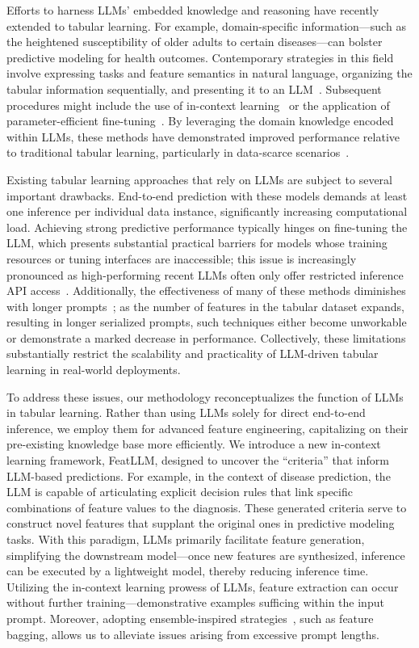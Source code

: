 Efforts to harness LLMs' embedded knowledge and reasoning have recently extended to tabular learning. For example, domain-specific information—such as the heightened susceptibility of older adults to certain diseases—can bolster predictive modeling for health outcomes. Contemporary strategies in this field involve expressing tasks and feature semantics in natural language, organizing the tabular information sequentially, and presenting it to an LLM~\cite{dinh2022lift,wang2023anypredict}. Subsequent procedures might include the use of in-context learning~\cite{nam2023semi} or the application of parameter-efficient fine-tuning~\cite{dinh2022lift,hegselmann2023tabllm}. By leveraging the domain knowledge encoded within LLMs, these methods have demonstrated improved performance relative to traditional tabular learning, particularly in data-scarce scenarios~\cite{hegselmann2023tabllm}.

Existing tabular learning approaches that rely on LLMs are subject to several important drawbacks. End-to-end prediction with these models demands at least one inference per individual data instance, significantly increasing computational load. Achieving strong predictive performance typically hinges on fine-tuning the LLM, which presents substantial practical barriers for models whose training resources or tuning interfaces are inaccessible; this issue is increasingly pronounced as high-performing recent LLMs often only offer restricted inference API access~\cite{anil2023palm,openai2023gpt4}. Additionally, the effectiveness of many of these methods diminishes with longer prompts~\cite{liu2023lost}; as the number of features in the tabular dataset expands, resulting in longer serialized prompts, such techniques either become unworkable or demonstrate a marked decrease in performance. Collectively, these limitations substantially restrict the scalability and practicality of LLM-driven tabular learning in real-world deployments.

To address these issues, our methodology reconceptualizes the function of LLMs in tabular learning. Rather than using LLMs solely for direct end-to-end inference, we employ them for advanced feature engineering, capitalizing on their pre-existing knowledge base more efficiently. We introduce a new in-context learning framework, \textsf{FeatLLM}, designed to uncover the “criteria” that inform LLM-based predictions. For example, in the context of disease prediction, the LLM is capable of articulating explicit decision rules that link specific combinations of feature values to the diagnosis. These generated criteria serve to construct novel features that supplant the original ones in predictive modeling tasks. With this paradigm, LLMs primarily facilitate feature generation, simplifying the downstream model—once new features are synthesized, inference can be executed by a lightweight model, thereby reducing inference time. Utilizing the in-context learning prowess of LLMs, feature extraction can occur without further training—demonstrative examples sufficing within the input prompt. Moreover, adopting ensemble-inspired strategies~\cite{breiman2001random}, such as feature bagging, allows us to alleviate issues arising from excessive prompt lengths.

